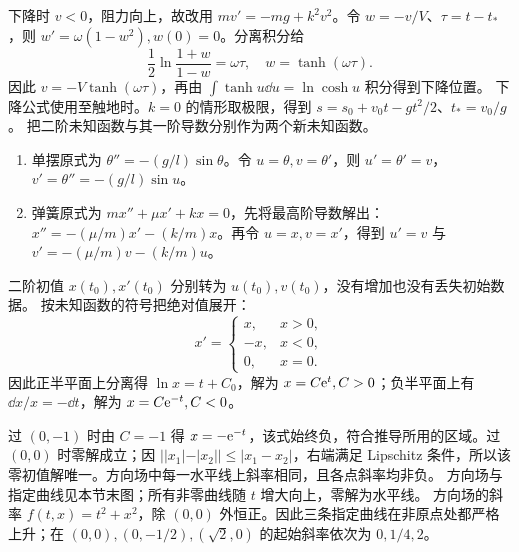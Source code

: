 下降时 $v<0$，阻力向上，故改用 $mv'=-mg+k^2v^2$。令 $w=-v/V$、$\tau=t-t_*$，则 $w'=\omega(1-w^2),w(0)=0$。分离积分给
\[
\dfrac12\ln\dfrac{1+w}{1-w}=\omega\tau,
\quad w=\tanh(\omega\tau).
\]
因此 $v=-V\tanh(\omega\tau)$，再由 $\displaystyle \int\tanh u\dd u=\ln\cosh u$ 积分得到下降位置。
下降公式使用至触地时。$k=0$ 的情形取极限，得到 $s=s_0+v_0t-gt^2/2$、$t_*=v_0/g$。
把二阶未知函数与其一阶导数分别作为两个新未知函数。
\begin{enumerate}
\item 单摆原式为 $\theta''=-(g/l)\sin\theta$。令 $u=\theta,v=\theta'$，则 $u'=\theta'=v$，$v'=\theta''=-(g/l)\sin u$。
\item 弹簧原式为 $mx''+\mu x'+kx=0$，先将最高阶导数解出：$x''=-(\mu/m)x'-(k/m)x$。再令 $u=x,v=x'$，得到 $u'=v$ 与 $v'=-(\mu/m)v-(k/m)u$。
\end{enumerate}
二阶初值 $x(t_0),x'(t_0)$ 分别转为 $u(t_0),v(t_0)$，没有增加也没有丢失初始数据。
按未知函数的符号把绝对值展开：
\[
x'=\begin{cases}x,&x>0,\\-x,&x<0,\\0,&x=0.\end{cases}
\]
因此正半平面上分离得 $\ln x=t+C_0$，解为 $x=C\mathrm e^t,C>0$；负半平面上有 $\dd x/x=-\dd t$，解为 $x=C\mathrm e^{-t},C<0$。

过 $(0,-1)$ 时由 $C=-1$ 得 $x=-\mathrm e^{-t}$，该式始终负，符合推导所用的区域。过 $(0,0)$ 时零解成立；因 $||x_1|-|x_2||\le|x_1-x_2|$，右端满足 Lipschitz 条件，所以该零初值解唯一。方向场中每一水平线上斜率相同，且各点斜率均非负。
方向场与指定曲线见本节末图；所有非零曲线随 $t$ 增大向上，零解为水平线。
方向场的斜率 $f(t,x)=t^2+x^2$，除 $(0,0)$ 外恒正。因此三条指定曲线在非原点处都严格上升；在 $(0,0),(0,-1/2),(\sqrt2,0)$ 的起始斜率依次为 $0,1/4,2$。

